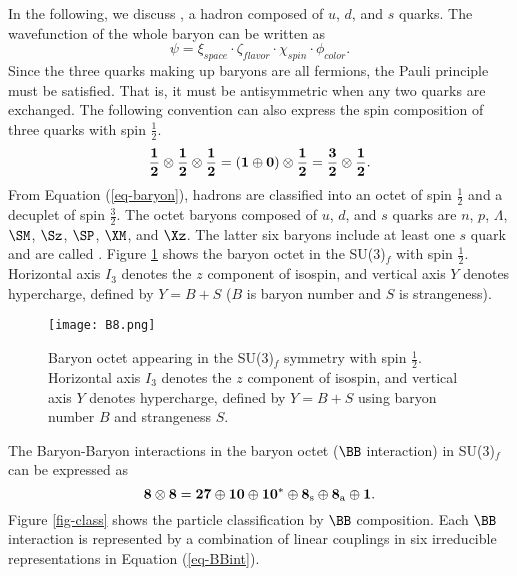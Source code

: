 In the following, we discuss , a hadron composed of $u$, $d$, and $s$ quarks. The wavefunction of the whole baryon can be written as
\begin{equation}
  \psi = \xi_{space} \cdot \zeta_{flavor} \cdot \chi_{spin} \cdot \phi_{color}.
\end{equation}
Since the three quarks making up baryons are all fermions, the Pauli principle must be satisfied. That is, it must be antisymmetric when any two quarks are exchanged.  The following convention can also express the spin composition of three quarks with spin $\frac{1}{2}$.
\begin{equation}
    {\bf \frac{1}{2}\otimes\frac{1}{2}\otimes\frac{1}{2}=(1\oplus0)\otimes\frac{1}{2}=\frac{3}{2}\otimes\frac{1}{2}}.
    \label{eq-baryon}
\end{equation}
From Equation (\ref{eq-baryon}), hadrons are classified into an octet of spin $\frac{1}{2}$ and a decuplet of spin $\frac{3}{2}$. The octet baryons composed of $u$, $d$, and $s$ quarks are $n$, $p$, $\Lambda$, $\SM$, $\Sz$, $\SP$, $\XM$, and $\Xz$. The latter six baryons include at least one $s$ quark and are called . Figure \ref{fig-B8} shows the baryon octet in the SU(3)$_f$ with spin $\frac{1}{2}$. Horizontal axis $I_{3}$ denotes the $z$ component of isospin, and vertical axis $Y$ denotes hypercharge, defined by $Y = B + S$ ($B$ is baryon number and $S$ is strangeness). 
\begin{figure}[h]
  \begin{center}
  \texttt{[image: B8.png]}
  \caption{Baryon octet appearing in the SU(3)$_f$ symmetry with spin $\frac{1}{2}$. Horizontal axis $I_{3}$ denotes the $z$ component of isospin, and vertical axis $Y$ denotes hypercharge, defined by $Y = B + S$ using baryon number $B$ and strangeness $S$.}
  \label{fig-B8}
  \end{center}
\end{figure}

The Baryon-Baryon interactions in the baryon octet ($\BB$ interaction) in SU(3)$_f$ can be expressed as
\begin{equation}
  {\bf 8\otimes 8 = 27\oplus 10\oplus 10^*\oplus 8_{\rm{s}}\oplus 8_{\rm{a}}\oplus 1}. 
  \label{eq-BBint}
\end{equation}
Figure \ref{fig-class} shows the particle classification by $\BB$ composition. Each $\BB$ interaction is represented by a combination of linear couplings in six irreducible representations in Equation (\ref{eq-BBint}).

